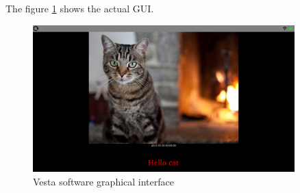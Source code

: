 The figure \ref{fig:graphical interface} shows the actual GUI.

\begin{figure}[!htb]
    \centering
    \includegraphics[width=0.9\textwidth,keepaspectratio]{chap/softFig/vesta_printscreen}
    \caption{Vesta software graphical interface}
    \label{fig:graphical interface}
\end{figure}


